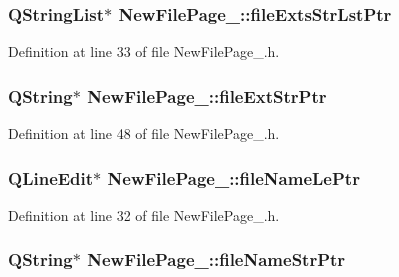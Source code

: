 \hypertarget{class_new_file_page__4_a33598f1f6153aa6c94c6100ff5864b3a}{
\subsubsection[{file\-Exts\-Str\-Lst\-Ptr}]{\setlength{\rightskip}{0pt plus 5cm}Q\-String\-List$\ast$ New\-File\-Page\-\_\-::file\-Exts\-Str\-Lst\-Ptr\hspace{0.3cm}{\ttfamily [private]}}}\label{class_new_file_page__4_a33598f1f6153aa6c94c6100ff5864b3a}


Definition at line 33 of file New\-File\-Page\-\_.\-h.

\hypertarget{class_new_file_page__4_abc0414737b129a20508aec86d31f830a}{
\subsubsection[{file\-Ext\-Str\-Ptr}]{\setlength{\rightskip}{0pt plus 5cm}Q\-String$\ast$ New\-File\-Page\-\_\-::file\-Ext\-Str\-Ptr\hspace{0.3cm}{\ttfamily [private]}}}\label{class_new_file_page__4_abc0414737b129a20508aec86d31f830a}


Definition at line 48 of file New\-File\-Page\-\_.\-h.

\hypertarget{class_new_file_page__4_a145cc995d3737d3d73ad1ed18c91492c}{
\subsubsection[{file\-Name\-Le\-Ptr}]{\setlength{\rightskip}{0pt plus 5cm}Q\-Line\-Edit$\ast$ New\-File\-Page\-\_\-::file\-Name\-Le\-Ptr\hspace{0.3cm}{\ttfamily [private]}}}\label{class_new_file_page__4_a145cc995d3737d3d73ad1ed18c91492c}


Definition at line 32 of file New\-File\-Page\-\_.\-h.

\hypertarget{class_new_file_page__4_aa44cfefe988a3e7a5bf85547683636bc}{
\subsubsection[{file\-Name\-Str\-Ptr}]{\setlength{\rightskip}{0pt plus 5cm}Q\-String$\ast$ New\-File\-Page\-\_\-::file\-Name\-Str\-Ptr\hspace{0.3cm}{\ttfamily [private]}}}\label{class_new_file_page__4_aa44cfefe988a3e7a5bf85547683636bc}


